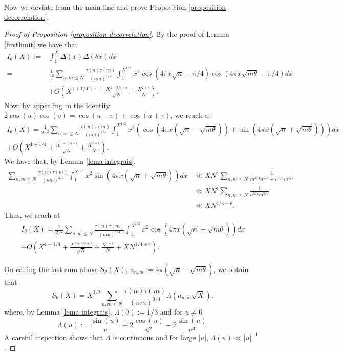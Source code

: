 \documentclass[a4paper,12pt, reqn0]{amsart}
\theoremstyle{remark}
\begin{document}
Now we deviate from the main line and prove Proposition \ref{proposition decorrelation}.
\begin{proof}[Proof of Proposition \ref{proposition decorrelation}]
By the proof of Lemma \ref{firstlimit} we have that
\begin{align*}
I_\theta(X):=&\int_{1}^X\Delta(x)\Delta(\theta x)dx\\
=&\frac{1}{\pi^2}
\sum_{n,m\leq N}
\frac{\tau(n)\tau(m)}{(nm)^{3/4}}
\int_{1}^{X^{1/2}} x^2 
\cos(4\pi x\sqrt{n}-\pi/4)\cos(4\pi x\sqrt{m\theta}-\pi/4)dx\\
&+O\left(X^{1+1/4+\epsilon}+\frac{X^{1+3/4+\epsilon}}{\sqrt{N}}+\frac{X^{2+\epsilon}}{N}\right).
\end{align*}
Now, by appealing to the identity $2\cos(u)\cos(v)=\cos(u-v)+\cos(u+v)$, we reach at
\begin{align*}
I_\theta(X)=\frac{1}{2\pi^2}
\sum_{n,m\leq N}
\frac{\tau(n)\tau(m)}{(nm)^{3/4}}
\int_{1}^{X^{1/2}} x^2 
\left(\cos(4\pi x(\sqrt{n}-\sqrt{m\theta}))  + \sin(4\pi x(\sqrt{n}+\sqrt{m\theta}))\right) dx\\+O\left(X^{1+1/4}+\frac{X^{1+3/4+\epsilon}}{\sqrt{N}} +\frac{X^{2+\epsilon}}{N}\right).
\end{align*}
We have that, by Lemma \ref{lema integrais},
\begin{align*}
\sum_{n,m\leq N}
\frac{\tau(n)\tau(m)}{(nm)^{3/4}}
\int_{1}^{X^{1/2}} x^2 
\sin(4\pi x(\sqrt{n}+\sqrt{m\theta}))dx & \ll X N^\epsilon \sum_{n,m\leq N}\frac{1}{m^{3/4}n^{5/4}+n^{3/4}m^{5/4}}\\
&\ll X N^\epsilon \sum_{n,m\leq N}\frac{1}{n^{3/4}m^{5/4}}\\
& \ll X N^{1/4+\epsilon}.
\end{align*}
 Thus, we reach at
\begin{align*}
I_\theta(X)=\frac{1}{2\pi^2}
\sum_{n,m\leq N}
\frac{\tau(n)\tau(m)}{(nm)^{3/4}}
\int_{1}^{X^{1/2}} x^2 
\cos(4\pi x(\sqrt{n}-\sqrt{m\theta}))dx\\+O\left(X^{1+1/4}+\frac{X^{1+3/4+\epsilon}}{\sqrt{N}} +\frac{X^{2+\epsilon}}{N}+XN^{1/4+\epsilon}\right).
\end{align*}


On calling the last sum above $S_\theta(X)$, $a_{n,m}:=4\pi(\sqrt{n} - \sqrt{m\theta})$, we obtain that
$$S_\theta(X)=X^{3/2}\sum_{n,m\leq N}
\frac{\tau(n)\tau(m)}{(nm)^{3/4}}\Lambda(a_{n,m}\sqrt{X}),$$
where, by Lemma \ref{lema integrais}, $\Lambda(0):=1/3$ and for $u\neq 0$ 
$$\Lambda(u):=\frac{\sin(u)}{u}+2\frac{\cos(u)}{u^2}-2\frac{\sin(u)}{u^3}.$$
A careful inspection shows that $\Lambda$ is continuous and for large $|u|$, $\Lambda(u)\ll |u|^{-1}$.


\end{proof}
\end{document}
